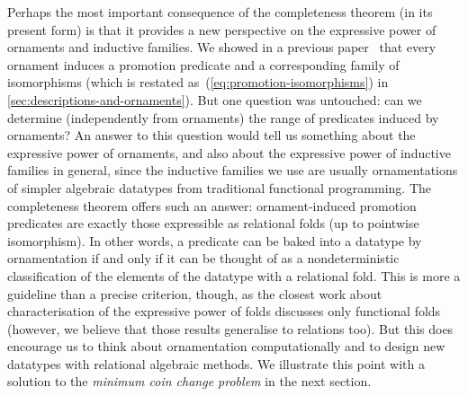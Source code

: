 Perhaps the most important consequence of the completeness theorem (in its present form) is that it provides a new perspective on the expressive power of ornaments and inductive families.
We showed in a previous paper~\cite{Ko-pcOrn} that every ornament induces a promotion predicate and a corresponding family of isomorphisms (which is restated as~(\ref{eq:promotion-isomorphisms}) in \autoref{sec:descriptions-and-ornaments}).
But one question was untouched: can we determine (independently from ornaments) the range of predicates induced by ornaments?
An answer to this question would tell us something about the expressive power of ornaments, and also about the expressive power of inductive families in general, since the inductive families we use are usually ornamentations of simpler algebraic datatypes from traditional functional programming.
The completeness theorem offers such an answer: ornament-induced promotion predicates are exactly those expressible as relational folds (up to pointwise isomorphism).
In other words, a predicate can be baked into a datatype by ornamentation if and only if it can be thought of as a nondeterministic classification of the elements of the datatype with a relational fold.
This is more a guideline than a precise criterion, though, as the closest work about characterisation of the expressive power of folds discusses only functional folds~\cite{Gibbons-kernels}
(however, we believe that those results generalise to relations too).
But this does encourage us to think about ornamentation computationally and to design new datatypes with relational algebraic methods.
We illustrate this point with a solution to the \emph{minimum coin change problem} in the next section.
